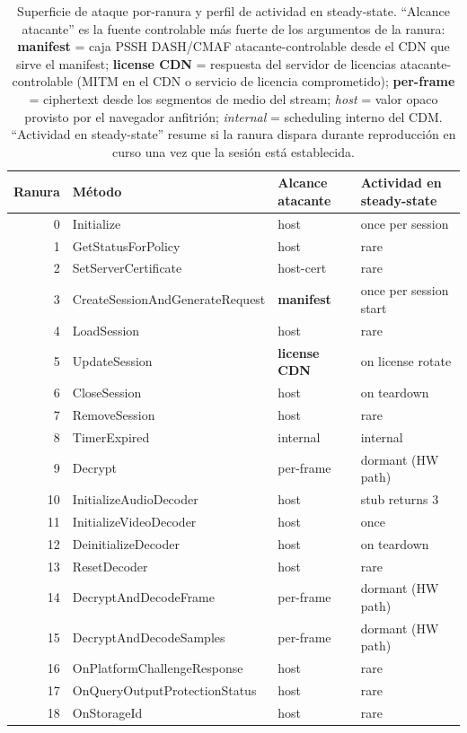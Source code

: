 \documentclass[11pt,letterpaper]{article}
\begin{document}
\begin{table}[h]
\centering\small
\begin{tabular}{rlll}
\toprule
\textbf{Ranura} & \textbf{Método} & \textbf{Alcance atacante} & \textbf{Actividad en steady-state} \\
\midrule
0  & Initialize                       & host & once per session \\
1  & GetStatusForPolicy               & host & rare \\
2  & SetServerCertificate             & host-cert & rare \\
3  & CreateSessionAndGenerateRequest  & \textbf{manifest} & once per session start \\
4  & LoadSession                      & host & rare \\
5  & UpdateSession                    & \textbf{license CDN} & on license rotate \\
6  & CloseSession                     & host & on teardown \\
7  & RemoveSession                    & host & rare \\
8  & TimerExpired                     & internal & internal \\
9  & Decrypt                          & per-frame  & dormant (HW path) \\
10 & InitializeAudioDecoder           & host & stub returns 3 \\
11 & InitializeVideoDecoder           & host & once \\
12 & DeinitializeDecoder              & host & on teardown \\
13 & ResetDecoder                     & host & rare \\
14 & DecryptAndDecodeFrame            & per-frame  & dormant (HW path) \\
15 & DecryptAndDecodeSamples          & per-frame  & dormant (HW path) \\
16 & OnPlatformChallengeResponse      & host & rare \\
17 & OnQueryOutputProtectionStatus    & host & rare \\
18 & OnStorageId                      & host & rare \\
\bottomrule
\end{tabular}
\caption{Superficie de ataque por-ranura y perfil de actividad
en steady-state. ``Alcance atacante'' es la fuente controlable
más fuerte de los argumentos de la ranura:
\textbf{manifest} = caja PSSH DASH/CMAF atacante-controlable
desde el CDN que sirve el manifest; \textbf{license CDN} =
respuesta del servidor de licencias atacante-controlable (MITM
en el CDN o servicio de licencia comprometido);
\textbf{per-frame} = ciphertext desde los segmentos de medio del
stream; \emph{host} = valor opaco provisto por el navegador
anfitrión; \emph{internal} = scheduling interno del CDM.
``Actividad en steady-state'' resume si la ranura dispara durante
reproducción en curso una vez que la sesión está establecida.}
\label{tab:attack-surface}
\end{table}
\end{document}

